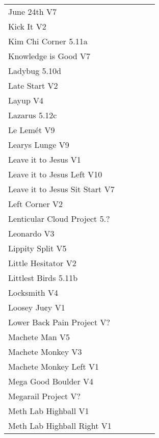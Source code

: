 \begin{flushleft}
\begin{center}
\begin{supertabular}{p{0.76\linewidth}p{0.08\linewidth}}
June 24th V7 & \pageref{rt:June 24th} \\
Kick It V2 & \pageref{rt:Kick It} \\
Kim Chi Corner 5.11a & \pageref{rt:Kim Chi Corner} \\
Knowledge is Good V7 & \pageref{vr:Knowledge is Good} \\
Ladybug 5.10d & \pageref{rt:Ladybug} \\
Late Start V2 & \pageref{vr:Late Start} \\
Layup V4 & \pageref{vr:Layup} \\
Lazarus 5.12c & \pageref{vr:Lazarus} \\
Le Lemét V9 & \pageref{rt:Le Lemét} \\
Learys Lunge V9 & \pageref{vr:Learys Lunge} \\
Leave it to Jesus V1 & \pageref{rt:Leave it to Jesus} \\
Leave it to Jesus Left V10 & \pageref{vr:Leave it to Jesus Left} \\
Leave it to Jesus Sit Start V7 & \pageref{vr:Leave it to Jesus Sit Start} \\
Left Corner V2 & \pageref{rt:Left Corner} \\
Lenticular Cloud Project 5.? & \pageref{rt:Lenticular Cloud Project} \\
Leonardo V3 & \pageref{rt:Leonardo} \\
Lippity Split V5 & \pageref{rt:Lippity Split} \\
Little Hesitator V2 & \pageref{rt:June 1} \\
Littlest Birds 5.11b & \pageref{rt:Littlest Birds} \\
Locksmith V4 & \pageref{rt:Locksmith} \\
Loosey Ju¢y V1 & \pageref{rt:Loosey Ju¢y} \\
Lower Back Pain Project V? & \pageref{vr:Lower Back Pain Project} \\
Machete Man V5 & \pageref{vr:Machete Man} \\
Machete Monkey V3 & \pageref{rt:Machete Monkey} \\
Machete Monkey Left V1 & \pageref{vr:Machete Monkey Left} \\
Mega Good Boulder V4 & \pageref{rt:MGB} \\
Megarail Project V? & \pageref{rt:Megarail Project} \\
Meth Lab Highball V1 & \pageref{rt:Meth Lab Highball} \\
Meth Lab Highball Right V1 & \pageref{rt:Meth Lab Highball Right} \\

\end{supertabular}
\end{center}
\end{flushleft}
